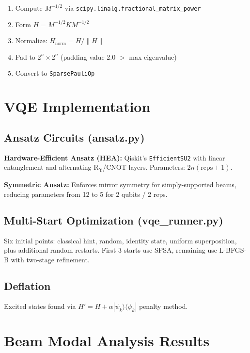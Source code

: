 \documentclass[12pt, a4paper]{article}
\begin{document}
\begin{enumerate}[noitemsep]
    \item Compute $M^{-1/2}$ via \texttt{scipy.linalg.fractional\_matrix\_power}
    \item Form $H = M^{-1/2} K M^{-1/2}$
    \item Normalize: $H_{\text{norm}} = H / \|H\|$
    \item Pad to $2^n \times 2^n$ (padding value 2.0 $>$ max eigenvalue)
    \item Convert to \texttt{SparsePauliOp}
\end{enumerate}

\section{VQE Implementation}

\subsection{Ansatz Circuits (ansatz.py)}

\textbf{Hardware-Efficient Ansatz (HEA):} Qiskit's \texttt{EfficientSU2} with linear entanglement and alternating R\textsubscript{Y}/CNOT layers. Parameters: $2n(\text{reps}+1)$.

\textbf{Symmetric Ansatz:} Enforces mirror symmetry for simply-supported beams, reducing parameters from 12 to 5 for 2 qubits / 2 reps.

\subsection{Multi-Start Optimization (vqe\_runner.py)}

Six initial points: classical hint, random, identity state, uniform superposition, plus additional random restarts. First 3 starts use SPSA, remaining use L-BFGS-B with two-stage refinement.

\subsection{Deflation}

Excited states found via $H' = H + \alpha |\psi_k\rangle\langle\psi_k|$ penalty method.

\section{Beam Modal Analysis Results}
\end{document}

